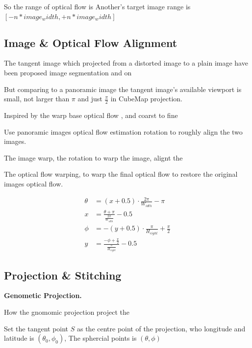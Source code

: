 So the range of optical flow is 
Another's target image range is $[- n * image_width, + n * image_width]$




\subsection{Image \& Optical Flow Alignment}

The tangent image which projected from a distorted image to a plain image have been proposed image segmentation and on ~\cite{eldercvpr2020}

But comparing to a panoramic image the tangent image's available viewport is small, not larger than $\pi$ and just $\frac{\pi}{2}$ in CubeMap projection.

Inspired by the warp base optical flow \cite{?}, and coarst to fine 

Use panoramic images optical flow estimation rotation to roughly align the two images.


The image warp, the rotation to warp the image, alignt the 

The optical flow warping, to warp the final optical flow to restore the original images optical flow.

\begin{equation}\label{equ:app:sph2erp}
	\begin{split}
		\theta &= (x+0.5) \cdot\frac{2 \pi}{W_{idth}}- \pi
		\\
		x &= \frac{\theta + \pi}{\frac{2\pi}{W_{idth}}} - 0.5
		\\
		\phi&=-(y+0.5) \cdot \frac{\pi}{H_{eight}} + \frac{\pi}{2}
		\\
		y &=\frac{-\phi+\frac{\pi}{2}}{\frac{\pi}{H_{eight}}}-0.5
	\end{split}
\end{equation}

\subsection{Projection \& Stitching}

\textbf{Genometic Projection.}

How the gnomomic projection project the 

Set the tangent point $S$ as the centre point of the projection, who longitude and latitude is $(\theta_0, \phi_0)$,
The sphercial points is $(\theta, \phi)$

